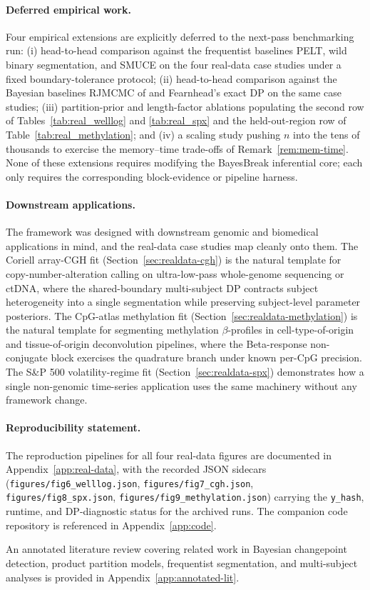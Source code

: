 \paragraph{Deferred empirical work.}
Four empirical extensions are explicitly deferred to the next-pass benchmarking run: (i)
head-to-head comparison against the frequentist baselines PELT, wild binary segmentation, and
SMUCE on the four real-data case studies under a fixed boundary-tolerance protocol; (ii)
head-to-head comparison against the Bayesian baselines RJMCMC of \citet{green1995rjMCMC} and
Fearnhead's exact DP \citep{fearnhead2006exact} on the same case studies; (iii) partition-prior
and length-factor ablations populating the second row of Tables~\ref{tab:real_welllog} and
\ref{tab:real_spx} and the held-out-region row of Table~\ref{tab:real_methylation}; and (iv) a
scaling study pushing $n$ into the tens of thousands to exercise the memory--time trade-offs of
Remark~\ref{rem:mem-time}. None of these extensions requires modifying the BayesBreak inferential
core; each only requires the corresponding block-evidence or pipeline harness.

\paragraph{Downstream applications.}
The framework was designed with downstream genomic and biomedical applications in mind, and the
real-data case studies map cleanly onto them. The Coriell array-CGH fit
(Section~\ref{sec:realdata-cgh}) is the natural template for copy-number-alteration calling on
ultra-low-pass whole-genome sequencing or ctDNA, where the shared-boundary multi-subject DP
contracts subject heterogeneity into a single segmentation while preserving subject-level
parameter posteriors. The CpG-atlas methylation fit
(Section~\ref{sec:realdata-methylation}) is the natural template for segmenting methylation
$\beta$-profiles in cell-type-of-origin and tissue-of-origin deconvolution pipelines, where the
Beta-response non-conjugate block exercises the quadrature branch under known per-CpG precision.
The S\&P 500 volatility-regime fit (Section~\ref{sec:realdata-spx}) demonstrates how a single
non-genomic time-series application uses the same machinery without any framework change.

\paragraph{Reproducibility statement.}
The reproduction pipelines for all four real-data figures are documented in
Appendix~\ref{app:real-data}, with the recorded JSON sidecars
(\texttt{figures/fig6\_welllog.json}, \texttt{figures/fig7\_cgh.json},
\texttt{figures/fig8\_spx.json}, \texttt{figures/fig9\_methylation.json}) carrying the
\texttt{y\_hash}, runtime, and DP-diagnostic status for the archived runs. The companion code
repository is referenced in Appendix~\ref{app:code}.

An annotated literature review covering related work in
Bayesian changepoint detection, product partition models, frequentist segmentation, and
multi-subject analyses is provided in Appendix~\ref{app:annotated-lit}.
